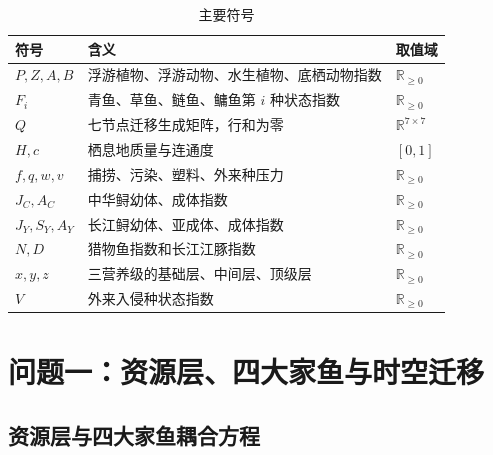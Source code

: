 \documentclass[withoutpreface,bwprint]{cumcmthesis}
\newcommand{\YTH}[1]{\textbf{#1}}
\newcommand{\R}{\mathbb{R}}
\begin{document}
\begin{table}[H]
\centering
\caption{主要符号}
\label{tab:symbols}
\small
\begin{tabularx}{0.9\textwidth}{>{\centering\arraybackslash}p{} X >{\centering\arraybackslash}p{}}
\toprule
\YTH{符号} & \YTH{含义} & \YTH{取值域} \\
\midrule
$P,Z,A,B$ & 浮游植物、浮游动物、水生植物、底栖动物指数 & $\R_{\ge 0}$ \\
$F_i$ & 青鱼、草鱼、鲢鱼、鳙鱼第 $i$ 种状态指数 & $\R_{\ge 0}$ \\
$Q$ & 七节点迁移生成矩阵，行和为零 & $\R^{7\times 7}$ \\
$H,c$ & 栖息地质量与连通度 & $[0,1]$ \\
$f,q,w,v$ & 捕捞、污染、塑料、外来种压力 & $\R_{\ge 0}$ \\
$J_C,A_C$ & 中华鲟幼体、成体指数 & $\R_{\ge 0}$ \\
$J_Y,S_Y,A_Y$ & 长江鲟幼体、亚成体、成体指数 & $\R_{\ge 0}$ \\
$N,D$ & 猎物鱼指数和长江江豚指数 & $\R_{\ge 0}$ \\
$x,y,z$ & 三营养级的基础层、中间层、顶级层 & $\R_{\ge 0}$ \\
$V$ & 外来入侵种状态指数 & $\R_{\ge 0}$ \\
\bottomrule
\end{tabularx}
\end{table}

\section{问题一：资源层、四大家鱼与时空迁移}
\renewcommand{\theequation}{3.\arabic{equation}}\setcounter{equation}{0}

\subsection{资源层与四大家鱼耦合方程}
\end{document}
